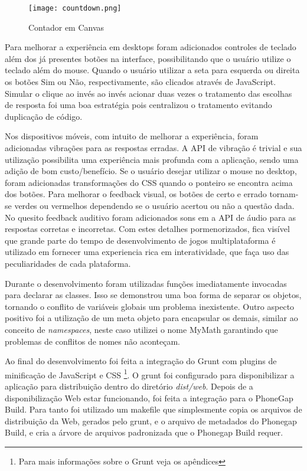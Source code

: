\begin{figure}[H]
    \centering
    \texttt{[image: countdown.png]}
	\caption{Contador em Canvas}
    \label{fig:counter}
\end{figure}

Para melhorar a experiência em desktops foram adicionados controles de
teclado além dos já presentes botões na interface, possibilitando que
o usuário utilize o teclado além do mouse. Quando o usuário utilizar
a seta para esquerda ou direita os botões Sim ou Não, respectivamente,
são clicados através de JavaScript. Simular o clique ao invés ao
invés acionar duas vezes o tratamento das escolhas de resposta foi uma boa
estratégia pois centralizou o tratamento evitando duplicação de código.

Nos dispositivos móveis, com intuito de melhorar a experiência, foram
adicionadas vibrações para as respostas erradas. A API de vibração
é trivial e sua utilização possibilita uma experiência mais
profunda com a aplicação, sendo uma adição de bom custo/benefício.
Se o usuário desejar utilizar o mouse no desktop, foram adicionadas
transformações do CSS quando o ponteiro se encontra acima dos
botões. Para melhorar o feedback visual, os botões de certo e errado
tornam-se verdes ou vermelhos dependendo se o usuário acertou ou não
a questão dada. No quesito feedback auditivo foram adicionados sons
em a API de áudio para as respostas corretas e incorretas. Com estes
detalhes pormenorizados, fica visível que grande parte do tempo de
desenvolvimento de jogos multiplataforma é utilizado em fornecer uma
experiencia rica em interatividade, que faça uso das peculiaridades de
cada plataforma.

Durante o desenvolvimento foram utilizadas funções imediatamente
invocadas para declarar as classes. Isso se demonstrou uma boa forma
de separar os objetos, tornando o conflito de variáveis globais um
problema inexistente. Outro aspecto positivo foi a utilização de
um meta objeto para encapsular os demais, similar ao conceito de
\textit{namespaces}, neste caso utilizei o nome MyMath garantindo que
problemas de conflitos de nomes não aconteçam.

Ao final do desenvolvimento foi feita a integração do Grunt com
plugins de minificação de JavaScript e CSS \footnote{Para mais
informações sobre o Grunt veja os apêndices}. O grunt foi configurado
para disponibilizar a aplicação para distribuição dentro do
diretório \textit{dist/web}. Depois de a disponibilização Web estar
funcionando, foi feita a integração para o PhoneGap Build. Para
tanto foi utilizado um makefile que simplesmente copia os arquivos de
distribuição da Web, gerados pelo grunt, e o arquivo de metadados do
Phonegap Build, e cria a árvore de arquivos padronizada que o Phonegap 
Build requer.

